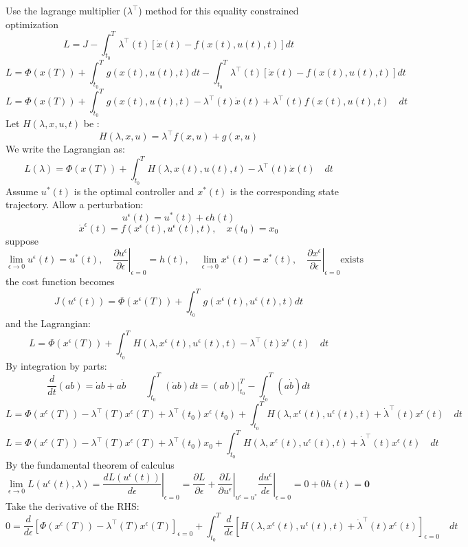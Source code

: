 \documentclass{article}
\begin{document}
Use the lagrange multiplier ($\lambda^{\top}$) method for this equality constrained optimization
\[
L=J-\int_{t_0}^T \lambda^{{\top}}(t)[\dot{x}(t)-f(x(t), u(t), t)] dt
\]
\[
L = \Phi(x(T)) + \int^T_{t_0}{g(x(t), u(t), t) dt} - \int_{t_0}^T \lambda^{{\top}}(t)[\dot{x}(t)-f(x(t), u(t), t)] dt 
\]
\[
L = \Phi(x(T)) + \int^T_{t_0}{g(x(t), u(t), t) - \lambda^{{\top}}(t)\dot{x}(t)+\lambda^{{\top}}(t)f(x(t), u(t), t) \quad dt }
\]
Let $H(\lambda, x, u, t)$ be :
\[
H(\lambda, x, u)=\lambda^{{\top}} f(x, u)+g(x, u)
\]
We write the Lagrangian as:
\[
L(\lambda) = \Phi(x(T)) + \int^T_{t_0}{H(\lambda, x(t), u(t), t) - \lambda^{{\top}}(t)\dot{x}(t)\quad dt }
\]
Assume $u^*(t)$ is the optimal controller and $x^*(t)$ is the corresponding state trajectory.
Allow a perturbation:
\[
u^\epsilon(t) = u^*(t) + \epsilon h(t) 
\]
\[
\dot x^\epsilon(t) = f\left(x^\epsilon(t),u^\epsilon(t), t\right), \quad x(t_0) = x_0
\]
suppose
\[
\lim_{\epsilon \rightarrow 0} u^\epsilon(t) = u^*(t),
\quad
\left. \frac{\partial u^\epsilon}{\partial \epsilon} \right|_{\epsilon=0} = h(t),
\quad
\lim_{\epsilon \rightarrow 0}{x^\epsilon(t)} = x^*(t),
\quad
\left. \frac{\partial x^\epsilon}{\partial \epsilon} \right|_{\epsilon=0} \text{exists}
\]
the cost function becomes
\[
J(u^\epsilon(t)) = \Phi(x^\epsilon(T)) + \int^T_{t_0}{g(x^\epsilon(t), u^\epsilon(t), t) dt}
\]
and the Lagrangian:
\[
L = \Phi(x^\epsilon(T)) + \int^T_{t_0}{H(\lambda, x^\epsilon(t), u^\epsilon(t), t) - \lambda^{{\top}}(t)\dot{x}^\epsilon(t)\quad dt }
\]
By integration by parts:
\[
\frac{d}{dt}(a b)=\dot{a}b+a\dot{b} \qquad \int_{t_0}^{T} (\dot{a}b) dt = \left.(ab)\right|_{t_0}^T - \int_{t_0}^{T} (a\dot{b}) dt
\]
\[
L = \Phi(x^\epsilon(T)) - \lambda^{{\top}}(T)x^\epsilon(T) + \lambda^{{\top}}(t_0)x^\epsilon(t_0) + \int^T_{t_0}{H(\lambda, x^\epsilon(t), u^\epsilon(t), t) + \dot{\lambda}^{{\top}}(t)x^\epsilon(t)\quad dt }
\]
\[
L = \Phi(x^\epsilon(T)) - \lambda^{{\top}}(T)x^\epsilon(T) + \lambda^{{\top}}(t_0)x_0 + \int^T_{t_0}{H(\lambda, x^\epsilon(t), u^\epsilon(t), t) + \dot{\lambda}^{{\top}}(t)x^\epsilon(t)\quad dt }
\]
By the fundamental theorem of calculus
\[
\lim_{\epsilon \rightarrow 0}{L(u^\epsilon(t), \lambda)} = \left.\frac{dL(u^\epsilon(t))}{d\epsilon} \right|_{\epsilon=0} =\frac{\partial L}{\partial \epsilon} + \left. \frac{\partial L}{\partial u^\epsilon}\right|_{u^\epsilon=u^*}    \left. \frac{du^\epsilon}{d\epsilon}\right|_{\epsilon=0} = 0+0h(t) = \textbf{0}
\]
Take the derivative of the RHS:
\[
0 = \frac{d}{d\epsilon}\left[\Phi(x^\epsilon(T)) - \lambda^{{\top}}(T)x^\epsilon(T)\right]_{\epsilon=0} + \int^T_{t_0}{\frac{d}{d\epsilon}\left[H(\lambda, x^\epsilon(t), u^\epsilon(t), t) + \dot{\lambda}^{{\top}}(t)x^\epsilon(t)\right]_{\epsilon=0} \quad dt }
\]
\end{document}
